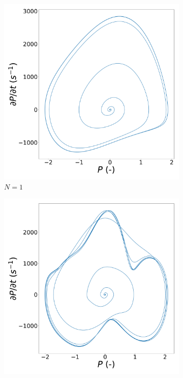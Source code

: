 \begin{figure}
    \centering
    \begin{subfigure}[b]{.49\linewidth}
        \includegraphics[width=\linewidth]{img/phase_diagram_N1.pdf}
        \caption{$N=1$}
        \label{fig:VDP_phase_N1}
    \end{subfigure}
    \hfill
    \begin{subfigure}[b]{.49\linewidth}
        \includegraphics[width=\linewidth]{img/phase_diagram_N2.pdf}

\end{subfigure}
\end{figure}
